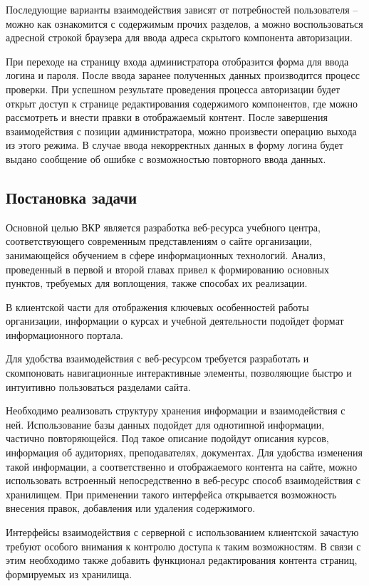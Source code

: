 Последующие варианты взаимодействия зависят от потребностей пользователя -- можно как ознакомится с содержимым прочих разделов, а можно воспользоваться адресной строкой браузера для ввода адреса скрытого компонента авторизации.

При переходе на страницу входа администратора отобразится форма для ввода логина и пароля.
После ввода заранее полученных данных производится процесс проверки.
При успешном результате проведения процесса авторизации будет открыт доступ к странице редактирования содержимого компонентов, где можно рассмотреть и внести правки в отображаемый контент.
После завершения взаимодействия с позиции администратора, можно произвести операцию выхода из этого режима.
В случае ввода некорректных данных в форму логина будет выдано сообщение об ошибке с возможностью повторного ввода данных.


\subsection{Постановка задачи}\label{Постановка задачи}

Основной целью ВКР является разработка веб-ресурса учебного центра, соответствующего современным представлениям о сайте организации, занимающейся обучением в сфере информационных технологий.
Анализ, проведенный в первой и второй главах привел к формированию основных пунктов, требуемых для воплощения, также способах их реализации.

В клиентской части для отображения ключевых особенностей работы организации, информации о курсах и учебной деятельности подойдет формат информационного портала.

Для удобства взаимодействия с веб-ресурсом требуется разработать и скомпоновать навигационные интерактивные элементы, позволяющие быстро и интуитивно пользоваться разделами сайта.

Необходимо реализовать структуру хранения информации и взаимодействия с ней.
Использование базы данных подойдет для однотипной информации, частично повторяющейся.
Под такое описание подойдут описания курсов, информация об аудиториях, преподавателях, документах.
Для удобства изменения такой информации, а соответственно и отображаемого контента на сайте, можно использовать встроенный непосредственно в веб-ресурс способ взаимодействия с хранилищем.
При применении такого интерфейса открывается возможность внесения правок, добавления или удаления содержимого.

Интерфейсы взаимодействия с серверной с использованием клиентской зачастую требуют особого внимания к контролю доступа к таким возможностям.
В связи с этим необходимо также добавить функционал редактирования контента страниц, формируемых из хранилища.

